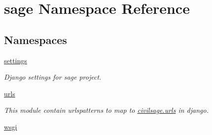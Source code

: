 \hypertarget{namespacesage}{}\section{sage Namespace Reference}
\label{namespacesage}
\subsection*{Namespaces}
\begin{DoxyCompactItemize}
\item 
 \hyperlink{namespacesage_1_1settings}{settings}
\begin{DoxyCompactList}\small\item\em Django settings for sage project. \end{DoxyCompactList}\item 
 \hyperlink{namespacesage_1_1urls}{urls}
\begin{DoxyCompactList}\small\item\em This module contain urlspatterns to map to \hyperlink{namespacecivilsage_1_1urls}{civilsage.\+urls} in django. \end{DoxyCompactList}\item 
 \hyperlink{namespacesage_1_1wsgi}{wsgi}
\end{DoxyCompactItemize}
